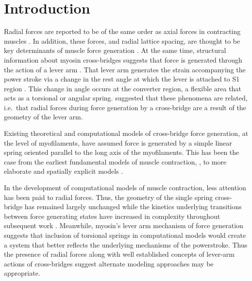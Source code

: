 \documentclass[]{article}
\begin{document}
\section{Introduction} %


Radial forces are reported to be of the same order as axial forces in contracting muscles \citep{Cecchi1990, Millman1998}. 
In addition, these forces, and radial lattice spacing, are thought to be key determinants of muscle force generation \citep{Fuchs2005}. 
At the same time, structural information about myosin cross-bridges suggests that force is generated through the action of a lever arm \citep{Rayment1993, Uyeda1996, Huxley2000}.
That lever arm generates the strain accompanying the power stroke via a change in the rest angle at which the lever is attached to S1 region \citep{Huxley2000, Houdusse2001}. 
This change in angle occurs at the converter region, a flexible area that acts as a torsional or angular spring. 
\citet{Schoenberg1980b} suggested that these phenomena are related, i.e.\ that radial forces during force generation by a cross-bridge are a result of the geometry of the lever arm. 

Existing theoretical and computational models of cross-bridge force generation, at the level of myofilaments, have assumed force is generated by a simple linear spring oriented parallel to the long axis of the myofilaments.  
This has been the case from the earliest fundamental models of muscle contraction, \citet{Huxley1957}, to more elaborate and spatially explicit models \citep{Daniel1998, Chase2004, Tanner2007}.  

In the development of computational models of muscle contraction, less attention has been paid to radial forces. 
Thus, the geometry of the single spring cross-bridge has remained largely unchanged while the kinetics underlying transitions between force generating states have increased in complexity throughout subsequent work \citep{Pate1989, Daniel1998, Tanner2007}.
Meanwhile, myosin's lever arm mechanism of force generation suggests that inclusion of torsional springs in computational models would create a system that better reflects the underlying mechanisms of the powerstroke. 
Thus the presence of radial forces along with well established concepts of lever-arm actions of cross-bridges suggest alternate modeling approaches may be appropriate.
\end{document}
